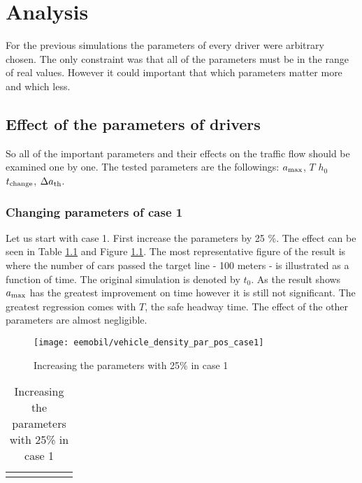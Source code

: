 \chapter{Analysis}
		For the previous simulations the parameters of every driver were arbitrary chosen. The only constraint was that all of the parameters must be in the range of real values. However it could important that which parameters matter more and which less.
	\section{Effect of the parameters of drivers}
		So all of the important parameters and their effects on the traffic flow should be examined one by one. The tested parameters are the followings: $a_{\rm max}$, $T$ $h_0$ $t_{\rm change} $, $\Delta a_{\rm th}$.
		\subsection{Changing parameters of case 1}
		Let us start with case 1. First increase the parameters by 25 \%. The effect can be seen in Table \ref{tab:vehicle_density_par_pos_case_1} and Figure \ref{fig:vehicle_density_par_pos_case_1}. The most representative figure of the result is where the number of cars passed the target line - 100 meters - is illustrated as a function of time. The original simulation is denoted by $t_0$. As the result shows $a_{\rm max}$ has the greatest improvement on time however it is still not significant. The greatest regression comes with $T$, the safe headway time. The effect of the other parameters are almost negligible.
		\begin{figure}[ht]
			\centering
			\texttt{[image: eemobil/vehicle\_density\_par\_pos\_case1]}
			\caption{Increasing the parameters with 25\% in case 1}
			\label{fig:vehicle_density_par_pos_case_1}
		\end{figure}
		\begin{table}[ht]
			\begin{center}
				\begin{tabular}{ |c|c|c|c|c|c|}
				\hline
				\vehicledensitypartable{1}
				\hline
				\end{tabular}
			\end{center}
			\caption{Increasing the parameters with 25\% in case 1}
			\label{tab:vehicle_density_par_pos_case_1}
		\end{table}
		
